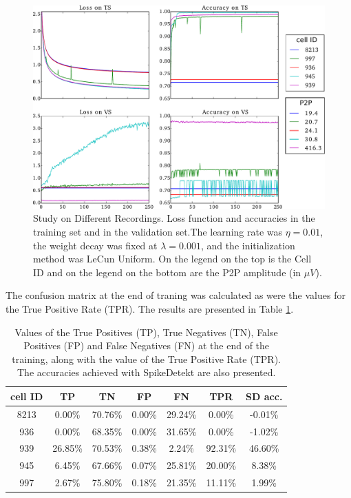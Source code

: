 \documentclass[10pt]{article}
\begin{document}
\begin{figure}[htb]
\captionsetup{font=small}

	\centering
	\includegraphics[width=\linewidth]{3.Chapter/study-on-different-cells-norm.pdf}
	\caption{Study on Different Recordings. Loss function and accuracies in the training set and in the validation set.The learning rate was $\eta = 0.01$, the weight decay was fixed at $\lambda = 0.001$, and the initialization method was LeCun Uniform. On the legend on the top is the Cell ID and on the legend on the bottom are the P2P amplitude (in $\mu V$).
}
\label{fig:study-cells}
\end{figure}

The confusion matrix at the end of traning was calculated as were the values for the True Positive Rate (TPR). The results are presented in Table \ref{table:confusion-matrix}.

\begin{table}[!htb]
\captionsetup{font=small}

\begin{center}
\begin{tabular}{c|cccc|cc}
cell ID & TP & TN & FP & FN & TPR & SD acc.\\ \hline
8213 & 0.00\% & 70.76\% & 0.00\% & 29.24\% & 0.00\% & -0.01\% \\
936 & 0.00\% & 68.35\% & 0.00\% & 31.65\% & 0.00\% & -1.02\% \\ 
939 & 26.85\% & 70.53\% & 0.38\% & 2.24\% & 92.31\% & 46.60\% \\ 
945 & 6.45\% & 67.66\% & 0.07\% & 25.81\% & 20.00\% & 8.38\% \\ 
997 & 2.67\% & 75.80\% & 0.18\% & 21.35\% & 11.11\% & 1.99\% \\ 
\end{tabular}
\end{center}
\caption{Values of the True Positives (TP), True Negatives (TN), False Positives (FP) and False Negatives (FN) at the end of the training, along with the value of the True Positive Rate (TPR). The accuracies achieved with SpikeDetekt are also presented. }
\label{table:confusion-matrix}
\end{table}
\end{document}
